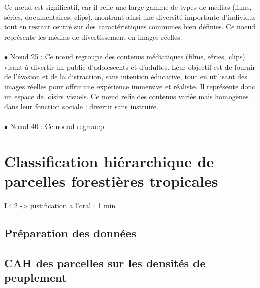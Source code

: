 \documentclass{article}
\begin{document}
Ce nœud est significatif, car il relie une large gamme de types de médias (films, séries, documentaires, clips), montrant ainsi une diversité importante d'individus tout en restant centré sur des caractéristiques communes bien définies. Ce noeud représente les médias de divertissement en images réelles.
\\\\
\noindent $\bullet$ \underline{Nœud 25} : Ce nœud regroupe des contenus médiatiques (films, séries, clips) visant à divertir un public d'adolescents et d'adultes. Leur objectif est de fournir de l’évasion et de la distraction, sans intention éducative, tout en utilisant des images réelles pour offrir une expérience immersive et réaliste.
Il représente donc un espace de loisirs visuels. Ce nœud relie des contenus variés mais homogènes dans leur fonction sociale : divertir sans instruire.
\\\\
\noindent $\bullet$ \underline{Nœud 40} : Ce noeud regruoep

\section{Classification hiérarchique de parcelles forestières tropicales}
L4.2 -> justification a l'oral : 1 min
\subsection{Préparation des données}
\subsection{CAH des parcelles sur les densités de peuplement}
\end{document}
